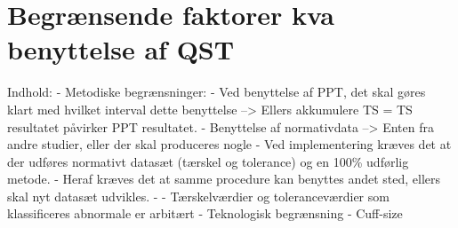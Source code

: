 \section{Begrænsende faktorer kva benyttelse af QST}

Indhold: 
 - Metodiske begrænsninger:
	 - Ved benyttelse af PPT, det skal gøres klart med hvilket interval dette benyttelse --> Ellers akkumulere TS = TS resultatet påvirker PPT resultatet.
	 - Benyttelse af normativdata --> Enten fra andre studier, eller der skal produceres nogle
	 - Ved implementering kræves det at der udføres normativt datasæt (tærskel og tolerance) og en 100\% udførlig metode.
		 - Heraf kræves det at samme procedure kan benyttes andet sted, ellers skal nyt datasæt udvikles.
		 -
	 - Tærskelværdier og toleranceværdier som klassificeres abnormale er arbitært 
 - Teknologisk begrænsning
	 - Cuff-size 
	   